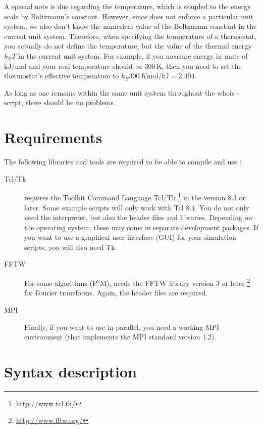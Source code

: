 A special note is due regarding the temperature, which is coupled to
the energy scale by Boltzmann's constant. However, since \es{} does not
enforce a particular unit system, we also don't know the numerical value
of the Boltzmann constant in the current unit system. Therefore, when
specifying the temperature of a thermostat, you actually do not define
the temperature, but the value of the thermal energy $k_B T$ in the
current unit system. For example, if you measure energy in units of
$\mathrm{kJ/mol}$ and your real temperature should be 300\,K, then you need to
set the thermostat's effective temperature to
$k_B 300\, K \mathrm{mol / kJ} = 2.494$.

As long as one remains within the same unit system throughout the
whole \es-script, there should be no problems.

\section{Requirements}
\label{sec:requirements}

The following libraries and tools are required to be able to compile
and use \es:

\begin{description}
\item[Tcl/Tk]  \es{} requires the Toolkit Command
  Language Tcl/Tk \footnote{\url{http://www.tcl.tk/}} in the version
  8.3 or later.  Some example scripts will only work with Tcl 8.4. You
  do not only need the interpreter, but also the header files and
  libraries.  Depending on the operating system, these may come in
  separate development packages. If you want to use a graphical user
  interface (GUI) for your simulation scripts, you will also need Tk.
  
\item[FFTW]  For some algorithms (\eg P$^3$M), \es needs
  the FFTW library version 3 or later
  \footnote{\url{http://www.fftw.org/}} for Fourier transforms.
  Again, the header files are required.
  
\item[MPI]  Finally, if you want to use \es in parallel,
  you need a working MPI environment (that implements the MPI standard
  version 1.2).
\end{description}


\section{Syntax description}
\label{sec:syntax}


